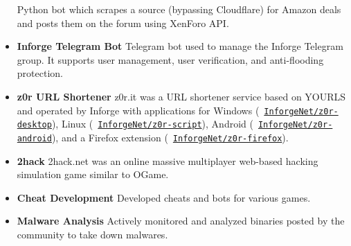 \begin{itemize}
		{\color{black!70}\footnotesize Python bot which scrapes a
		source (bypassing Cloudflare) for Amazon deals and posts them
		on the forum using XenForo API.}\smallskip\newline
	\item \textbf{Inforge Telegram Bot}\hfill{}\newline
		{\color{black!70}\footnotesize Telegram bot used to manage the
		Inforge Telegram group. It supports user management, user
		verification, and anti-flooding protection.}\smallskip\newline
	\item \textbf{z0r URL Shortener}\hfill{}\newline
		{\color{black!70}\footnotesize z0r.it was a URL shortener
		service based on YOURLS and operated by Inforge with
		applications for Windows
		(\faGithub~\href{https://github.com/InforgeNet/z0r-desktop}{\texttt{InforgeNet/z0r-desktop}}),
		Linux
		(\faGithub~\href{https://github.com/InforgeNet/z0r-script}{\texttt{InforgeNet/z0r-script}}),
		Android
		(\faGithub~\href{https://github.com/InforgeNet/z0r-android}{\texttt{InforgeNet/z0r-android}}),
		and a Firefox extension
		(\faGithub~\href{https://github.com/InforgeNet/z0r-firefox}{\texttt{InforgeNet/z0r-firefox}}).}
		\smallskip\newline
	\item \textbf{2hack}\hfill\losttag\newline
		{\color{black!70}\footnotesize 2hack.net was an online massive
		multiplayer web-based hacking simulation game similar to
		OGame.}\smallskip\newline
	\item \textbf{Cheat Development}\hfill\losttag\newline
		{\color{black!70}\footnotesize Developed cheats and bots for
		various games.}\smallskip\newline
	\item \textbf{Malware Analysis}\newline
		{\color{black!70}\footnotesize Actively monitored and analyzed
		binaries posted by the community to take down
		malwares.}\smallskip\newline
\end{itemize}

